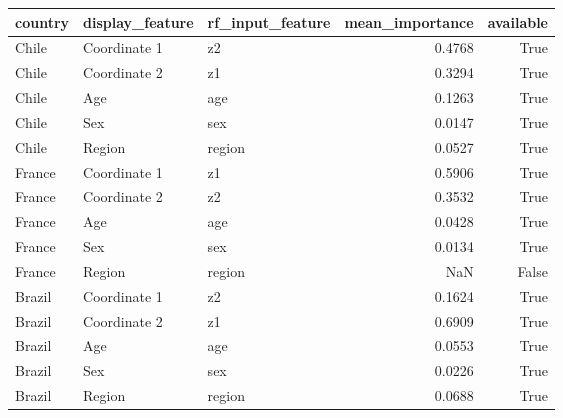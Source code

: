 \begin{tabular}{lllrr}
\toprule
country & display_feature & rf_input_feature & mean_importance & available \\
\midrule
Chile & Coordinate 1 & z2 & 0.4768 & True \\
Chile & Coordinate 2 & z1 & 0.3294 & True \\
Chile & Age & age & 0.1263 & True \\
Chile & Sex & sex & 0.0147 & True \\
Chile & Region & region & 0.0527 & True \\
France & Coordinate 1 & z1 & 0.5906 & True \\
France & Coordinate 2 & z2 & 0.3532 & True \\
France & Age & age & 0.0428 & True \\
France & Sex & sex & 0.0134 & True \\
France & Region & region & NaN & False \\
Brazil & Coordinate 1 & z2 & 0.1624 & True \\
Brazil & Coordinate 2 & z1 & 0.6909 & True \\
Brazil & Age & age & 0.0553 & True \\
Brazil & Sex & sex & 0.0226 & True \\
Brazil & Region & region & 0.0688 & True \\
\bottomrule
\end{tabular}
